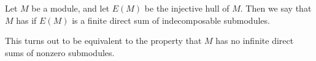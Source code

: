 \documentclass{article}
\begin{document}
Let $M$ be a module, 
and let $E(M)$ be the injective hull of $M$.
Then we say that $M$ has {\it {}}
if $E(M)$ is a finite direct sum
of indecomposable submodules.

This turns out to be equivalent to the property
that $M$ has no infinite direct sums of nonzero submodules.
\end{document}
